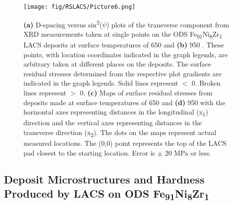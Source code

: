 		
		\begin{figure}
			\centering
			\texttt{[image: fig/RSLACS/Picture6.png]}
			\caption[D-spacing versus sin\textsuperscript{2}($\psi$) plots of the transverse component from XRD measurements taken at single points on the ODS Fe\textsubscript{91}Ni\textsubscript{8}Zr\textsubscript{1} LACS deposits at surface temperatures of 650 \celsius{} and 950 \celsius{}.]{\textbf{(a)} D-spacing versus sin\textsuperscript{2}($\psi$) plots of the transverse component from XRD measurements taken at single points on the ODS Fe\textsubscript{91}Ni\textsubscript{8}Zr\textsubscript{1} LACS deposits at surface temperatures of 650 \celsius{} and \textbf{(b)} 950 \celsius{}. These points, with location coordinates indicated in the graph legends, are arbitrary taken at different places on the deposits. The surface residual stresses determined from the respective plot gradients are indicated in the graph legends. Solid lines represent  $<$ 0. Broken lines represent  $>$ 0. \textbf{(c) }Maps of surface residual stresses from deposits made at surface temperatures of 650 \celsius{} and \textbf{(d) }950 \celsius{} with the horizontal axes representing distances in the longitudinal (x\textsubscript{1}) direction and the vertical axes representing distances in the transverse direction (x\textsubscript{2}). The dots on the maps represent actual measured locations. The (0,0) point represents the top of the LACS pad closest to the starting location. Error is $ \pm $  20 MPa or less.}
			\label{fig:RSLACS6}
		\end{figure}
		
	
	
	
	\subsection*{Deposit Microstructures and Hardness Produced by LACS on ODS Fe\textsubscript{91}Ni\textsubscript{8}Zr\textsubscript{1} }
	
